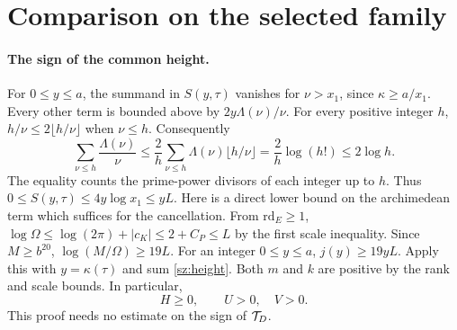 \section{Comparison on the selected family}\label{sz:comparison}\label{sec:comparison}

\paragraph{The sign of the common height.}
For $0\le y\le a$, the summand in $S(y,\tau)$ vanishes for $\nu>x_1$,
since $\kappa\ge a/x_1$. Every other term is bounded above by
$2y\Lambda(\nu)/\nu$. For every positive integer $h$,
$h/\nu\le2\lfloor h/\nu\rfloor$ when $\nu\le h$. Consequently
\[
 \sum_{\nu\le h}\frac{\Lambda(\nu)}{\nu}
 \le\frac{2}{h}\sum_{\nu\le h}\Lambda(\nu)\lfloor h/\nu\rfloor
 =\frac{2}{h}\log(h!)\le 2\log h.
\]
The equality counts the prime-power divisors of each integer up to $h$.
Thus $0\le S(y,\tau)\le4y\log x_1\le yL$.
Here is a direct lower bound on the archimedean term which suffices for
the cancellation. From $\mathrm{rd}_E\ge1$,
$\log\Omega\le\log(2\pi)+|c_K|\le 2+C_P\le L$ by the first scale
inequality. Since $M\ge b^{20}$, $\log(M/\Omega)\ge19L$.
For an integer $0\le y\le a$, $j(y)\ge19yL$.
Apply this with $y=\kappa(\tau)$ and sum \eqref{sz:height}.
Both $m$ and $k$ are positive by the rank and scale bounds. In particular,
\begin{equation}\label{sz:nonneg}
 H\ge0,\qquad U>0,\quad V>0 .
\end{equation}
This proof needs no estimate on the sign of $\mathcal T_D$.

